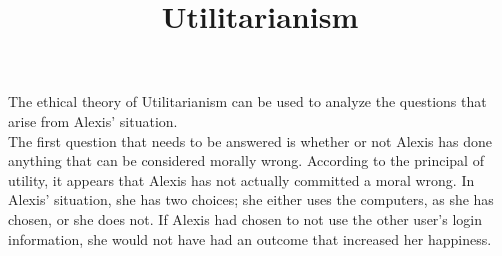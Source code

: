 \documentclass{paper}
\title{Utilitarianism}
\date{}
\author{}
\begin{document}
\drafth{}
\inlinetitle

The ethical theory of Utilitarianism can be used to analyze the questions that arise from Alexis'
situation.\\

The first question that needs to be answered is whether or not Alexis has done anything that can be
considered morally wrong. According to the principal of utility, it appears that Alexis has not actually
committed a moral wrong. In Alexis' situation, she has two choices; she either uses the computers, as she
has chosen, or she does not. If Alexis had chosen to not use the other user's login information, she would
not have had an outcome that increased her happiness. 
\end{document}
